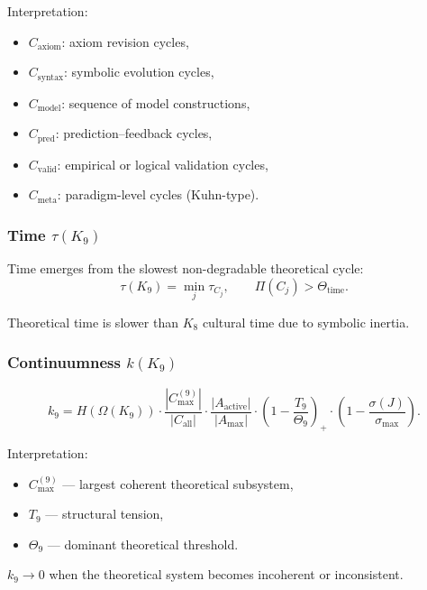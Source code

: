 Interpretation:
\begin{itemize}
    \item $C_{\mathrm{axiom}}$: axiom revision cycles,
    \item $C_{\mathrm{syntax}}$: symbolic evolution cycles,
    \item $C_{\mathrm{model}}$: sequence of model constructions,
    \item $C_{\mathrm{pred}}$: prediction–feedback cycles,
    \item $C_{\mathrm{valid}}$: empirical or logical validation cycles,
    \item $C_{\mathrm{meta}}$: paradigm-level cycles (Kuhn-type).
\end{itemize}

\subsubsection{Time \texorpdfstring{$\tau(K_9)$}{\tau(K_9)}}

Time emerges from the slowest non-degradable theoretical cycle:
\[
\tau(K_9)=\min_j \tau_{C_j},
\qquad
\Pi(C_j) > \Theta_{\mathrm{time}}.
\]

Theoretical time is slower than $K_8$ cultural time due to symbolic inertia.

\subsubsection{Continuumness \texorpdfstring{$k(K_9)$}{k(K_9)}}

\[
k_9 =
H(\Omega(K_9))
\cdot
\frac{|C_{\max}^{(9)}|}{|C_{\mathrm{all}}|}
\cdot
\frac{|A_{\mathrm{active}}|}{|A_{\max}|}
\cdot
\left(1-\frac{T_9}{\Theta_9}\right)_+
\cdot
\left(1-\frac{\sigma(J)}{\sigma_{\max}}\right).
\]

Interpretation:
\begin{itemize}
    \item $C_{\max}^{(9)}$ — largest coherent theoretical subsystem,
    \item $T_9$ — structural tension,
    \item $\Theta_9$ — dominant theoretical threshold.
\end{itemize}

$k_9 \to 0$ when the theoretical system becomes incoherent or inconsistent.

